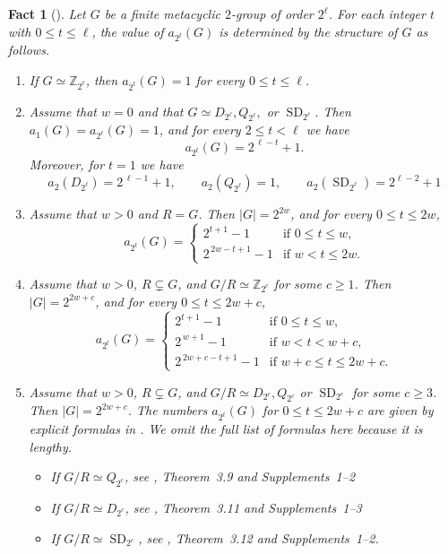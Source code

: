 \documentclass[onecolumn]{article}
\numberwithin{equation}{section}
\theoremstyle{mytheoremstyle}
\newtheorem{fac}[thm]{Fact}
\DeclareMathOperator{\SD}{\mathrm{SD}}
\begin{document}
\begin{fac}[\cite{Berkovich2011}]\label{fac:metacyclic-2-subgroup-numbers}
Let $G$ be a finite metacyclic $2$-group of order $2^{\ell}$.
For each integer $t$ with $0\le t\le \ell$, the value of $a_{2^{t}}(G)$
is determined by the structure of $G$ as follows.
\begin{enumerate}
  \item[\textup{(1)}]
  If $G\simeq \mathbb{Z}_{2^{\ell}}$, then $a_{2^{t}}(G)=1$ for every $0\le t\le \ell$.

\item[\textup{(2)}]
Assume that $w=0$ and that $G \simeq D_{2^{\ell}}, Q_{2^{\ell}},$ or $\SD_{2^{\ell}}$.
Then $a_{1}(G)=a_{2^{\ell}}(G)=1$, and for every $2\le t<\ell$ we have
\[
  a_{2^{t}}(G)=2^{\,\ell-t}+1.
\]
Moreover, for $t=1$ we have
\[a_{2}(D_{2^{\ell}})=2^{\,\ell-1}+1,\qquad a_{2}(Q_{2^{\ell}})=1,\qquad a_{2}(\SD_{2^{\ell}})=2^{\ell-2}+1  \]

  \item[\textup{(3)}]
  Assume that $w>0$ and $R=G$.
  Then $|G|=2^{2w}$, and for every $0\le t\le 2w$,
  \[
    a_{2^{t}}(G)
    =
    \begin{cases}
      2^{t+1}-1         & \text{if } 0\le t\le w,\\
      2^{\,2w-t+1}-1    & \text{if } w<t\le 2w.
    \end{cases}
  \]

  \item[\textup{(4)}]
  Assume that $w>0$, $R\subsetneq G$, and $G/R\simeq \mathbb{Z}_{2^{c}}$
  for some $c\ge1$.
  Then $|G|=2^{2w+c}$, and for every $0\le t\le 2w+c$,
  \[
    a_{2^{t}}(G)
    =
    \begin{cases}
      2^{t+1}-1        & \text{if } 0\le t\le w,\\
      2^{\,w+1}-1      & \text{if } w<t<w+c,\\
      2^{\,2w+c-t+1}-1 & \text{if } w+c\le t\le 2w+c.
    \end{cases}
  \]

  \item[\textup{(5)}]
  Assume that $w>0$, $R\subsetneq G$, and
  $G/R\simeq D_{2^{c}}, Q_{2^{c}}$ or $\SD_{2^{c}}$ for some $c\ge3$.
  Then $|G|=2^{2w+c}$.
  The numbers $a_{2^{t}}(G)$ for $0\le t\le 2w+c$ are given by explicit formulas in
  \cite{Berkovich2011}.
  We omit the full list of formulas here because it is lengthy.
  \begin{itemize}
    \item If $G/R\simeq Q_{2^{c}}$, see \cite{Berkovich2011}, Theorem~3.9 and Supplements~1--2
    \item If $G/R\simeq D_{2^{c}}$, see \cite{Berkovich2011}, Theorem~3.11 and Supplements~1--3
    \item If $G/R\simeq \SD_{2^{c}}$, see \cite{Berkovich2011}, Theorem~3.12 and Supplements~1--2.
  \end{itemize}

  \end{enumerate}
\end{fac}
\end{document}

